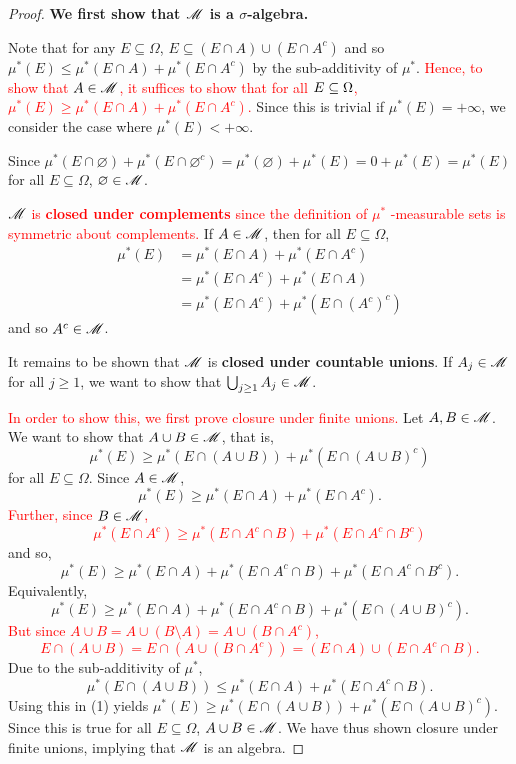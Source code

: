 \begin{proof}        
    \textbf{We first show that $\mathscr{M}$ is a $\sigma$-algebra. }
    
    Note that for any $E \subseteq \Omega$, $E \subseteq (E \cap A) \cup (E \cap A^c)$ and so $\mu^*(E) \leq \mu^*(E \cap A) + \mu^*(E \cap A^c)$ by the sub-additivity of $\mu^*$. \textcolor{red}{Hence, to show that $A \in \mathscr{M}$, it suffices to show that for all $E \subseteq \Omega$, $\mu^*(E) \geq \mu^*(E \cap A) + \mu^*(E \cap A^c)$.} Since this is trivial if $\mu^*(E) = +\infty$, we consider the case where $\mu^*(E) < +\infty$.
            
    Since $\mu^*(E \cap \varnothing) + \mu^*(E \cap \varnothing^c) = \mu^*(\varnothing) + \mu^*(E) = 0 + \mu^*(E) = \mu^*(E)$ for all $E \subseteq\Omega$, $\varnothing \in \mathscr{M}$.
    
    \textcolor{red}{$\mathscr{M}$ is \textbf{closed under complements} since the definition of $\mu^*$ -measurable sets is symmetric about complements.} If $A \in \mathscr{M}$, then for all $E \subseteq \Omega$, 
    \begin{align*}
    \mu^*(E) &= \mu^*(E \cap A) + \mu^*(E \cap A^c) \\
            &= \mu^*(E \cap A^c) + \mu^*(E \cap A) \\
            &= \mu^*(E \cap A^c) + \mu^*(E \cap (A^c)^c)                 
    \end{align*}
    and so $A^c \in \mathscr{M}$.

    It remains to be shown that $\mathscr{M}$ is \textbf{closed under countable unions}. If $A_j \in \mathscr{M}$ for all $j \geq 1$, we want to show that $\bigcup_{j \geq 1} A_j \in \mathscr{M}$. 
    
    \textcolor{red}{In order to show this, we first prove closure under finite unions.} Let $A, B \in \mathscr{M}$. We want to show that $A\cup B \in \mathscr{M}$, that is,
    \[ \mu^*(E) \geq \mu^*(E \cap(A \cup B)) + \mu^*(E \cap (A \cup B)^c)\]
    for all $E \subseteq \Omega$. Since $A \in \mathscr{M}$, 
    \[ \mu^*(E) \geq \mu^*(E \cap A) + \mu^*(E \cap A^c). \]
    \textcolor{red}{Further, since $B \in \mathscr{M}$, 
    \[ \mu^*(E \cap A^c) \geq \mu^*(E \cap A^c \cap B) + \mu^*(E \cap A^c \cap B^c) \]}
    and so,             
    \[ \mu^*(E) \geq \mu^*(E \cap A) + \mu^*(E \cap A^c \cap B) + \mu^*(E \cap A^c \cap B^c).\]
    Equivalently,  
    \begin{equation}
    \mu^*(E) \geq \mu^*(E \cap A) + \mu^*(E \cap A^c \cap B) + \mu^*(E \cap (A \cup B)^c).
    \end{equation}
    \textcolor{red}{But since $A \cup B = A \cup (B \setminus A) = A \cup (B \cap A^c)$, 
    \[ E \cap (A \cup B) = E \cap (A \cup (B \cap A^c)) = (E \cap A) \cup (E \cap A^c \cap B). \] }
    Due to the sub-additivity of $\mu^*$,  
    \[ \mu^*(E \cap (A \cup B)) \leq \mu^*(E \cap A) + \mu^*(E \cap A^c \cap B). \]
    Using this in (1) yields $\mu^*(E) \geq \mu^*(E \cap (A \cup B)) + \mu^*(E \cap (A \cup B)^c)$. Since this is true for all $E \subseteq \Omega$, $A \cup B \in \mathscr{M}$. We have thus shown closure under finite unions, implying that $\mathscr{M}$ is an algebra. 


\end{proof}
